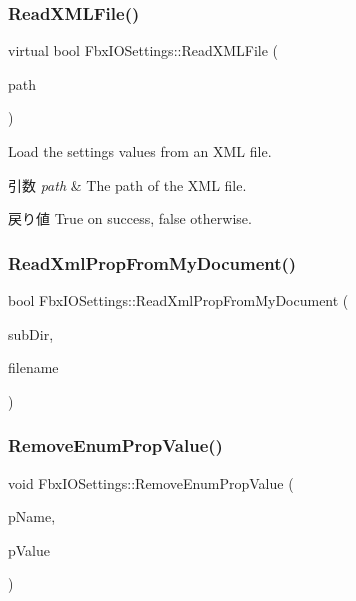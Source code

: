 \subsubsection{\texorpdfstring{Read\+X\+M\+L\+File()}{ReadXMLFile()}}
{\footnotesize\ttfamily virtual bool Fbx\+I\+O\+Settings\+::\+Read\+X\+M\+L\+File (\begin{DoxyParamCaption}\item[{const \hyperlink{class_fbx_string}{Fbx\+String} \&}]{path }\end{DoxyParamCaption})\hspace{0.3cm}{\ttfamily [virtual]}}

Load the settings values from an X\+ML file. 
\begin{DoxyParams}{引数}
{\em path} & The path of the X\+ML file. \\
\hline
\end{DoxyParams}
\begin{DoxyReturn}{戻り値}
{\ttfamily True} on success, {\ttfamily false} otherwise. 
\end{DoxyReturn}
\mbox{\label{class_fbx_i_o_settings_a843dcbf01c90245e4bfc08effe999acc}} 
\subsubsection{\texorpdfstring{Read\+Xml\+Prop\+From\+My\+Document()}{ReadXmlPropFromMyDocument()}}
{\footnotesize\ttfamily bool Fbx\+I\+O\+Settings\+::\+Read\+Xml\+Prop\+From\+My\+Document (\begin{DoxyParamCaption}\item[{const \hyperlink{class_fbx_string}{Fbx\+String} \&}]{sub\+Dir,  }\item[{const \hyperlink{class_fbx_string}{Fbx\+String} \&}]{filename }\end{DoxyParamCaption})}

\mbox{\label{class_fbx_i_o_settings_aebf0649980477e8ec80d1d9364304392}} 
\subsubsection{\texorpdfstring{Remove\+Enum\+Prop\+Value()}{RemoveEnumPropValue()}}
{\footnotesize\ttfamily void Fbx\+I\+O\+Settings\+::\+Remove\+Enum\+Prop\+Value (\begin{DoxyParamCaption}\item[{const char $\ast$}]{p\+Name,  }\item[{\hyperlink{class_fbx_string}{Fbx\+String}}]{p\+Value }\end{DoxyParamCaption})}

